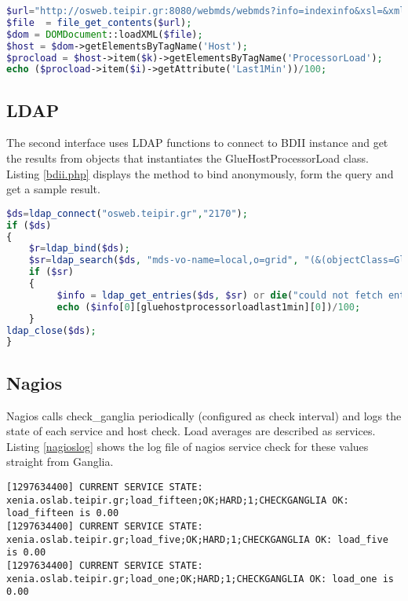 \begin{lstlisting}[language=PHP,caption=PHP DOM call to WebMDS,label=wsrf.php]
$url="http://osweb.teipir.gr:8080/webmds/webmds?info=indexinfo&xsl=&xmlSource.indexinfo.param.xpathQuery=%2F%2F*[local-name%28%29%3D%27Host%27]";
$file  = file_get_contents($url);
$dom = DOMDocument::loadXML($file);
$host = $dom->getElementsByTagName('Host');
$procload = $host->item($k)->getElementsByTagName('ProcessorLoad');
echo ($procload->item($i)->getAttribute('Last1Min'))/100;
\end{lstlisting}

\subsection{LDAP}

The second interface uses LDAP functions to connect to BDII instance and get the results from objects that instantiates the GlueHostProcessorLoad class. Listing \ref{bdii.php} displays the method to bind anonymously, form the query and get a sample result.

\begin{lstlisting}[language=PHP,caption=PHP LDAP call to BDII,label=bdii.php]
$ds=ldap_connect("osweb.teipir.gr","2170");
if ($ds)
{
    $r=ldap_bind($ds);
    $sr=ldap_search($ds, "mds-vo-name=local,o=grid", "(&(objectClass=GlueHostProcessorLoad))");
    if ($sr)
    {
         $info = ldap_get_entries($ds, $sr) or die("could not fetch entries");
         echo ($info[0][gluehostprocessorloadlast1min][0])/100;
    }
ldap_close($ds);
}
\end{lstlisting}

\subsection{Nagios}

Nagios calls check\_ganglia periodically (configured as check interval) and logs the state of each service and host check. Load averages are described as services. Listing \ref{nagioslog} shows the log file of nagios service check for these values straight from Ganglia.
\begin{lstlisting}[caption=Nagios log with load check,label=nagioslog,nolol]
[1297634400] CURRENT SERVICE STATE: xenia.oslab.teipir.gr;load_fifteen;OK;HARD;1;CHECKGANGLIA OK: load_fifteen is 0.00
[1297634400] CURRENT SERVICE STATE: xenia.oslab.teipir.gr;load_five;OK;HARD;1;CHECKGANGLIA OK: load_five is 0.00
[1297634400] CURRENT SERVICE STATE: xenia.oslab.teipir.gr;load_one;OK;HARD;1;CHECKGANGLIA OK: load_one is 0.00
\end{lstlisting}


